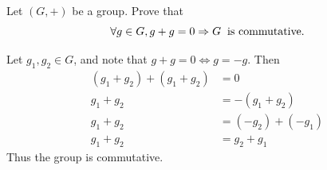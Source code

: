 \documentclass[12pt]{article}
\begin{document}
\begin{statement}
Let $(G,+)$ be a group. Prove that
    $$ \forall g \in G, g+g = 0 \Rightarrow G \hspace{0.2cm} \text{is commutative}.$$
\end{statement}
\begin{newproof}
  Let $g_1,g_2 \in G$, and note that $g+g=0 \iff g=-g$. Then 
  \begin{align*}
    (g_1 + g_2) + (g_1 + g_2) &=  0 \\
    g_1 + g_2 & = -(g_1 + g_2) \\
    g_1 + g_2 &= (-g_2) + (-g_1) \\
    g_1 + g_2 &= g_2 + g_1
  \end{align*}
  Thus the group is commutative.
\end{newproof}
\end{document}
